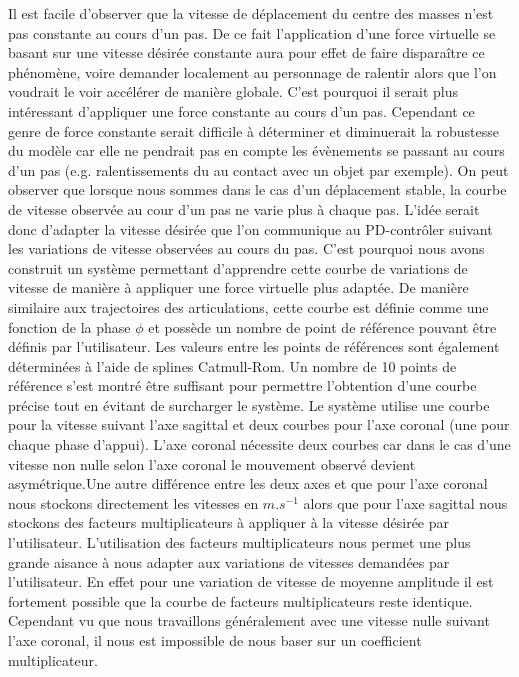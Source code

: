 \documentclass[runningheads,a4paper]{llncs}
\begin{document}
Il est facile d'observer que la vitesse de déplacement du centre des masses n'est pas constante au cours d'un pas. De ce fait l'application d'une force virtuelle se basant sur une vitesse désirée constante aura pour effet de faire disparaître ce phénomène, voire demander localement au personnage de ralentir alors que l'on voudrait le voir accélérer de manière globale. C'est pourquoi il serait plus intéressant d'appliquer une force constante au cours d'un pas. Cependant ce genre de force constante serait difficile à déterminer et diminuerait la robustesse du modèle car elle ne pendrait pas en compte les évènements se passant au cours d'un pas (e.g. ralentissements du au contact avec un objet par exemple). On peut observer que lorsque nous sommes dans le cas d'un déplacement stable, la courbe de vitesse observée au cour d'un pas ne varie plus à chaque pas. L'idée serait donc d'adapter la vitesse désirée que l'on communique au PD-contrôler suivant les variations de vitesse observées au cours du pas. C'est pourquoi nous avons construit un système permettant d'apprendre cette courbe de variations de vitesse de manière à appliquer une force virtuelle plus adaptée. De manière similaire aux trajectoires des articulations, cette courbe est définie comme une fonction de la phase \(\phi\) et possède un nombre de point de référence pouvant être définis par l'utilisateur. Les valeurs entre les points de références sont également déterminées à l'aide de splines Catmull-Rom. Un nombre de 10 points de référence s'est montré être suffisant pour permettre l'obtention d'une courbe précise tout en évitant de surcharger le système. Le système utilise une courbe pour la vitesse suivant l'axe sagittal et deux courbes pour l'axe coronal (une pour chaque phase d'appui). L'axe coronal nécessite deux courbes car dans le cas d'une vitesse non nulle selon l'axe coronal le mouvement observé devient asymétrique.Une autre différence entre les deux axes et que pour l'axe coronal nous stockons directement les vitesses en $m.s^{-1}$ alors que pour l'axe sagittal nous stockons des facteurs multiplicateurs à appliquer à la vitesse désirée par l'utilisateur. L'utilisation des facteurs multiplicateurs nous permet une plus grande aisance à nous adapter aux variations de vitesses demandées par l'utilisateur. En effet pour une variation de vitesse de moyenne amplitude il est fortement possible que la courbe de facteurs multiplicateurs reste identique. Cependant vu que nous travaillons généralement avec une vitesse nulle suivant l'axe coronal, il nous est impossible de nous baser sur un coefficient multiplicateur.
\end{document}
